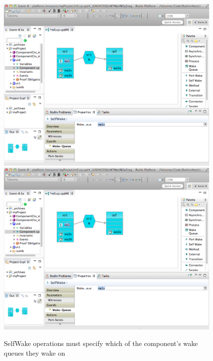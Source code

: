 \begin{figure}[!htbp]
  \centering
  \ifplastex
  \includegraphics[width=1024]{figures/image57.png}
  \else
  \includegraphics[width=1\textwidth]{figures/image57.png}
  \fi
  \caption{SelfWake operations must specify which of the component's wake queues they wake on}
  \label{fig:SelfWakeOperationsMustSpecifyWhichOfTheComponentsWakeQueuesTheyWakeOn}
\end{figure}  
